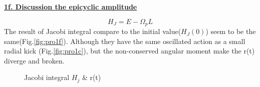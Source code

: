 \documentclass{article}
\begin{document}
\underline{\textbf{1f. Discussion the epicyclic amplitude}}

$$H_J=E-\Omega_pL$$
The result of Jacobi integral compare to the initial value($H_J(0)$) seem to be the same(Fig.\ref{fig:pro1f}). Although they have the same oscillated action as a small radial kick (Fig.\ref{fig:pro1c}), but the non-conserved angular moment make the r(t) diverge and broken.
\begin{figure}[h]
    \centering
    \caption{Jacobi integral $H_{j}$ \& r(t)}
    \label{fig:pro1ef}
\end{figure}
\end{document}
